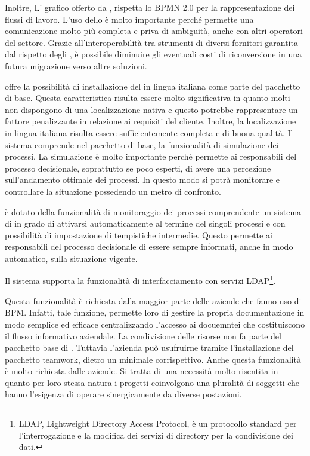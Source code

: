 Inoltre, L' grafico offerto da , rispetta lo  BPMN 2.0 per la rappresentazione dei flussi di lavoro. L'uso dello  è molto importante perché permette una comunicazione molto più completa e priva di ambiguità, anche con altri operatori del settore. Grazie all'interoperabilità tra strumenti di diversi fornitori garantita dal rispetto degli , è possibile diminuire gli eventuali costi di riconversione in una futura migrazione verso altre soluzioni.

 offre la possibilità di installazione del \sw in lingua italiana come parte del pacchetto di base. Questa caratteristica risulta essere molto significativa in quanto molti \sw non dispongono di una localizzazione nativa e questo potrebbe rappresentare un fattore penalizzante in relazione ai requisiti del cliente. Inoltre, la localizzazione in lingua italiana risulta essere sufficientemente completa e di buona qualità. 
 Il sistema  comprende nel pacchetto di base, la funzionalità di simulazione dei processi. La simulazione è molto importante perché permette ai responsabili del processo decisionale, soprattutto se poco esperti, di avere una percezione sull'andamento ottimale dei processi. In questo modo si potrà monitorare e controllare la situazione possedendo un metro di confronto.

 è dotato della funzionalità di monitoraggio dei processi comprendente un sistema di  in grado di attivarsi automaticamente al termine del singoli processi e con possibilità di impostazione di tempistiche intermedie. Questo permette ai responsabili del processo decisionale di essere sempre informati, anche in modo automatico, sulla situazione vigente.

Il sistema supporta la funzionalità di interfacciamento con servizi LDAP\footnote{LDAP,  Lightweight Directory Access Protocol, è un protocollo standard per l'interrogazione e la modifica dei servizi di directory per la condivisione dei dati.\label{note:ldap}}. 

Questa funzionalità è richiesta dalla maggior parte delle aziende che fanno uso di \sw BPM. Infatti, tale funzione, permette loro di gestire la propria documentazione in modo semplice ed efficace centralizzando l'accesso ai docuemntei che costituiscono il flusso informativo aziendale.
La condivisione delle risorse non fa parte del pacchetto base di . 
Tuttavia l'azienda può usufruirne tramite l'installazione del pacchetto \textsf{teamwork}, dietro un minimale corrispettivo.
Anche questa funzionalità è molto richiesta dalle aziende. Si tratta di una necessità molto risentita in quanto per loro stessa natura i progetti coinvolgono una pluralità di soggetti che hanno l'esigenza di  operare sinergicamente da diverse postazioni.

